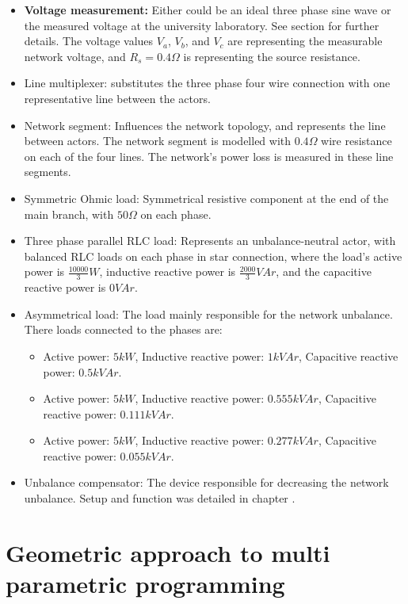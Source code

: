 \begin{itemize}
\item \textbf{Voltage measurement:} Either could be an ideal three phase sine wave or the measured voltage at the university laboratory. See section  for further details. The voltage values $V_a$, $V_b$, and $V_c$ are representing the measurable network voltage, and $R_s=0.4\Omega$ is representing the source resistance.
\item Line multiplexer: substitutes the three phase four wire connection with one representative line between the actors.
\item Network segment: Influences the network topology, and represents the line between actors. The network segment is modelled with $0.4\Omega$ wire resistance on each of the four lines. The network's power loss is measured in these line segments.
\item Symmetric Ohmic load: Symmetrical resistive component at the end of the main branch, with $50\Omega$ on each phase.
\item Three phase parallel RLC load: Represents an unbalance-neutral actor, with balanced RLC loads on each phase in star connection, where the load's active power is $\frac{10000}{3}W$, inductive reactive power is $\frac{2000}{3}VAr$, and the capacitive reactive power is $0VAr$.
\item Asymmetrical load: The load mainly responsible for the network unbalance. There loads connected to the phases are:
\begin{itemize}
    \item Active power: $5kW$, Inductive reactive power: $1kVAr$, Capacitive reactive power: $0.5kVAr$.
    \item Active power: $5kW$, Inductive reactive power: $0.555kVAr$, Capacitive reactive power: $0.111kVAr$.
    \item Active power: $5kW$, Inductive reactive power: $0.277kVAr$, Capacitive reactive power: $0.055kVAr$.
\end{itemize}
\item Unbalance compensator: The device responsible for decreasing the network unbalance. Setup and function was detailed in chapter .
\end{itemize}


\section{Geometric approach to multi parametric programming}\label{BASICCSR:sec:MPP}

